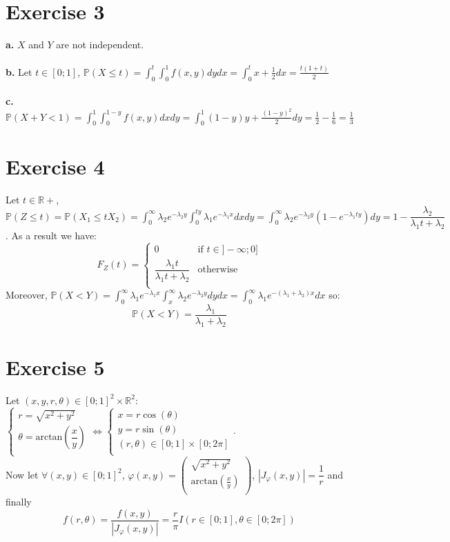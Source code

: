 \documentclass{article}
\begin{document}
\section*{Exercise 3}
\textbf{a.} $X$ and $Y$ are not independent.
\\\\
\textbf{b.} Let $t\in[0;1]$, $\mathbb{P}(X\leq t) = \int_0^t\int_0^1f(x,y)dydx = \int_0^tx+\frac{1}{2}dx = \frac{t(1+t)}{2}$ 
\\\\
\textbf{c.} $\mathbb{P}(X+Y<1) = \int_0^1 \int_0^{1-y} f(x,y)dxdy =\int_0^1 (1-y)y +\frac{(1-y)^2}{2}dy = \frac{1}{2}-\frac{1}{6} = \frac{1}{3}$
\section*{Exercise 4}
Let $t \in \mathbb{R}+$, $\mathbb{P}(Z\leq t) = \mathbb{P}(X_1\leq tX_2) = \int_0^\infty\lambda_2e^{-\lambda_2y}\int_0^{ty}\lambda_1e^{-\lambda_1x}dxdy = \int_0^\infty \lambda_2e^{-\lambda_2y}(1-e^{-\lambda_1ty})dy = 1 - \dfrac{\lambda_2}{\lambda_1t+\lambda_2}$. As a result we have: 
$$\boxed{F_Z(t) = \left\{\begin{array}{cc}
    0 & \text{if } t\in]-\infty;0]\\
    \dfrac{\lambda_1t}{\lambda_1t+\lambda_2} & \text{otherwise}\\
\end{array}\right.}$$
Moreover, $\mathbb{P}(X<Y) = \int_0^\infty \lambda_1e^{-\lambda_1x}\int_x^\infty \lambda_2e^{-\lambda_2y}dydx = \int_0^\infty\lambda_1e^{-(\lambda_1+\lambda_2)x}dx$ so:
$$\boxed{\mathbb{P}(X<Y) = \frac{\lambda_1}{\lambda_1+\lambda_2}}$$
\section*{Exercise 5}
Let $(x,y,r,\theta)\in [0;1]^2\times \mathbb{R}^2$: $\left\{\begin{array}{cc}
    r = \sqrt{x^2+y^2}\\
    \theta = \text{arctan}\left(\dfrac{x}{y}\right)\\
\end{array}\right. \Leftrightarrow \left\{\begin{array}{cc}
    x = r\cos(\theta)\\
    y = r\sin(\theta)\\
    (r,\theta) \in[0;1]\times[0;2\pi]\\
\end{array}\right.$.
\\
 Now let $\forall (x,y)\in[0;1]^2$, $\varphi(x,y) = \left(\begin{array}{c}
    \sqrt{x^2+y^2}\\
    \text{arctan}(\frac{x}{y})\\
 \end{array}\right)$, $|J_\varphi(x,y)| = \dfrac{1}{r}$ and finally $$\boxed{f(r,\theta) = \dfrac{f(x,y)}{|J_\varphi(x,y)|} = \dfrac{r}{\pi} I(r\in[0;1],\theta \in [0;2\pi])}$$
\end{document}
